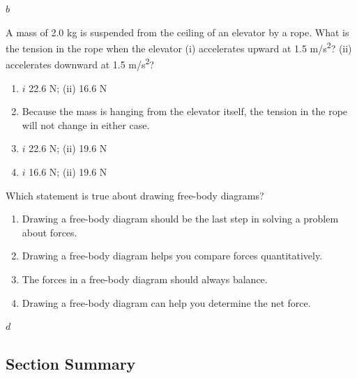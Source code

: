 \documentclass[
]{book}
\providecommand{\tightlist}{%
  \setlength{\itemsep}{0pt}\setlength{\parskip}{0pt}}
\begin{document}
\leavevmode{}%
\(b\)

\hypertarget{fs-id1459777}{}
\leavevmode{}%
A mass of 2.0 kg is suspended from the ceiling of an elevator by a rope.
What is the tension in the rope when the elevator (i) accelerates upward
at 1.5 m/s\textsuperscript{2}? (ii) accelerates downward at 1.5 m/s\textsuperscript{2}?

\begin{enumerate}
\def\labelenumi{\alph{enumi}.}
\tightlist
\item
  \(i\) 22.6 N; (ii) 16.6 N
\item
  Because the mass is hanging from the elevator itself, the tension in
  the rope will not change in either case.
\item
  \(i\) 22.6 N; (ii) 19.6 N
\item
  \(i\) 16.6 N; (ii) 19.6 N
\end{enumerate}

\hypertarget{fs-id1795701}{}
\leavevmode{}%
Which statement is true about drawing free-body diagrams?

\begin{enumerate}
\def\labelenumi{\alph{enumi}.}
\tightlist
\item
  Drawing a free-body diagram should be the last step in solving a
  problem about forces.
\item
  Drawing a free-body diagram helps you compare forces quantitatively.
\item
  The forces in a free-body diagram should always balance.
\item
  Drawing a free-body diagram can help you determine the net force.
\end{enumerate}

\leavevmode{}%
\(d\)

\hypertarget{fs-id1452262-summary}{}
\hypertarget{section-summary-13}{%
\subsection{Section Summary}\label{section-summary-13}}
\end{document}
